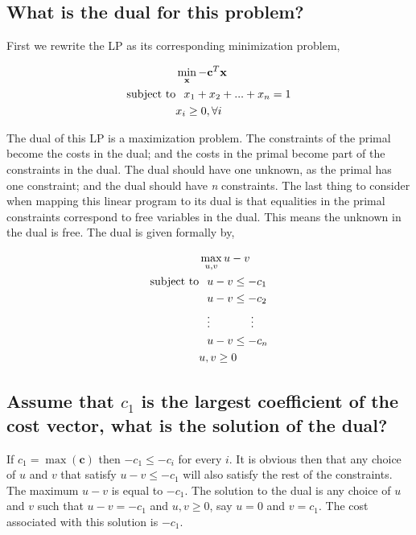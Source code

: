 \documentclass{article}
\begin{document}
\subsection{What is the dual for this problem?}

First we rewrite the LP as its corresponding minimization problem,

\begin{align*}
&\min_\mathbf{x} -\mathbf{c}^T \mathbf{x} \\
\text{subject to} & \hspace{0.1in} x_1 + x_2 + ... + x_n = 1\\
&x_i \ge 0, \forall i
\end{align*}

The dual of this LP is a maximization problem.
The constraints of the primal become the costs in the dual; and the costs in the primal become part of the constraints in the dual.
The dual should have one unknown, as the primal has one constraint; and the dual should have \textit{n} constraints.
The last thing to consider when mapping this linear program to its dual is that equalities in the primal constraints correspond to free variables in the dual.
This means the unknown in the dual is free.
The dual is given formally by,

\begin{align*}
&\max_{u, v} u - v \\
\text{subject to} & \hspace{0.1in} u - v \le -c_1\\
& \hspace{0.1in} u - v \le -c_2\\
& \hspace{0.1in} \vdots \hspace{0.5in} \vdots\\
& \hspace{0.1in} u - v \le -c_n\\ 
&u, v \ge 0
\end{align*}

\subsection{Assume that $c_1$ is the largest coefficient of the cost vector, what is the solution of the dual?}

If $c_1 = \max(\mathbf{c})$ then $-c_1 \le -c_i$ for every $i$.
It is obvious then that any choice of $u$ and $v$ that satisfy $u - v \le -c_1$ will also satisfy the rest of the constraints.
The maximum $u - v$ is equal to $-c_1$.
The solution to the dual is any choice of $u$ and $v$ such that $u - v = -c_1$ and $u, v \ge 0$, say $u = 0$ and $v = c_1$.
The cost associated with this solution is $-c_1$.
\end{document}
